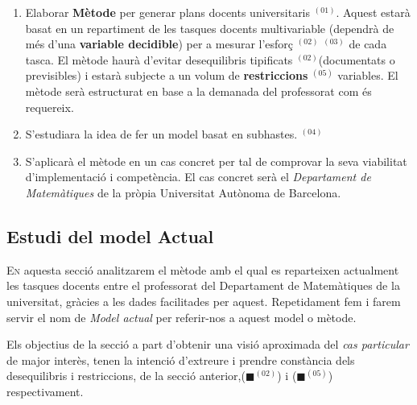 \documentclass[10pt,twocolumn]{article}
\begin{document}
\begin{tcolorbox}[colback=black!1,title=\textbf{0bjectius},coltitle=black,colbacktitle=black!10]
	\begin{enumerate}
	\item Elaborar \textbf{Mètode} per generar plans docents universitaris{\color{cyan!80} $^{(01)}$}. Aquest estarà basat en un repartiment de les tasques docents multivariable (dependrà de més d'una \textbf{variable decidible}) per a mesurar l'esforç{\color{blue!80} $^{(02)}$}{\color{green!80} $^{(03)}$} de cada tasca. El mètode haurà d'evitar desequilibris tipificats{\color{blue!80} $^{(02)}$}(documentats o previsibles) i estarà subjecte a un volum de \textbf{restriccions}{\color{violet!60} $^{(05)}$} variables. El mètode serà estructurat en base a la demanada del professorat com és requereix.
	\item S'estudiara la idea de fer un model basat en  subhastes.{\color{purple!80} $^{(04)}$} 
	\item S'aplicarà el mètode en un cas concret per tal de comprovar la seva viabilitat d'implementació  i competència. El cas concret serà el \textit{Departament de Matemàtiques} de la pròpia Universitat Autònoma de Barcelona.
	\end{enumerate}
\end{tcolorbox}
\vspace{5mm}
\newpage
\begin{tcolorbox}[colframe=white,colback=redviolet!20,sharp corners=all,size=minimal,halign=center,valign=center]
\section{Estudi del model Actual}
\end{tcolorbox}
\lettrine{E}n aquesta secció analitzarem el mètode amb el qual  es reparteixen actualment les tasques docents entre el professorat del Departament de Matemàtiques de la universitat,  gràcies a les dades facilitades per aquest. Repetidament fem i farem servir el nom de \textit{Model actual}  per referir-nos a  aquest model o mètode.

Els objectius de la secció a  part d'obtenir una visió aproximada del \textit{cas particular} de major interès, tenen la intenció d'extreure i prendre constància dels desequilibris i restriccions, de la secció anterior,({\color{blue!60}$\blacksquare$}$^{(02)}$) i ({\color{violet!60}$\blacksquare$}$^{(05)}$)  respectivament. 
\\
\end{document}
